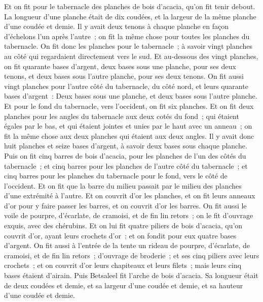 \begin{multicols}{2}
Et on fit pour le tabernacle des planches de bois d'acacia, qu'on fit tenir debout.
La longueur d'une planche était de dix coudées, et la largeur de la même planche d'une coudée et demie.
Il y avait deux tenons à chaque planche en façon d'échelons l'un après l'autre~; on fit la même chose pour toutes les planches du tabernacle.
On fit donc les planches pour le tabernacle~; à savoir vingt planches au côté qui regardaient directement vers le sud.
Et au-dessous des vingt planches, on fit quarante bases d'argent, deux bases sous une planche, pour ses deux tenons, et deux bases sous l'autre planche, pour ses deux tenons.
On fit aussi vingt planches pour l'autre côté du tabernacle, du côté nord,
et leurs quarante bases d'argent~: Deux bases sous une planche, et deux bases sous l'autre planche.
Et pour le fond du tabernacle, vers l'occident, on fit six planches.
Et on fit deux planches pour les angles du tabernacle aux deux cotés du fond~;
qui étaient égales par le bas, et qui étaient jointes et unies par le haut avec un anneau~; on fit la même chose aux deux planches qui étaient aux deux angles.
Il y avait donc huit planches et seize bases d'argent, à savoir deux bases sous chaque planche.
Puis on fit cinq barres de bois d'acacia, pour les planches de l'un des côtés du tabernacle~;
et cinq barres pour les planches de l'autre côté du tabernacle~; et cinq barres pour les planches du tabernacle pour le fond, vers le côté de l'occident.
Et on fit que la barre du milieu passait par le milieu des planches d'une extrémité à l'autre.
Et on couvrit d'or les planches, et on fit leurs anneaux d'or pour y faire passer les barres, et on couvrit d'or les barres.
On fit aussi le voile de pourpre, d'écarlate, de cramoisi, et de fin lin retors~; on le fit d'ouvrage exquis, avec des chérubins.
Et on lui fit quatre piliers de bois d'acacia, qu'on couvrit d'or, ayant leurs crochets d'or~; et on fondit pour eux quatre bases d'argent.
On fit aussi à l'entrée de la tente un rideau de pourpre, d'écarlate, de cramoisi, et de fin lin retors~; d'ouvrage de broderie~;
et ses cinq piliers avec leurs crochets~; et on couvrit d'or leurs chapiteaux et leurs filets~; mais leurs cinq bases étaient d'airain.
\VerseOne{}Puis Betsaleel fit l'arche de bois d'acacia. Sa longueur était de deux coudées et demie, et sa largeur d'une coudée et demie, et sa hauteur d'une coudée et demie.

\end{multicols}
